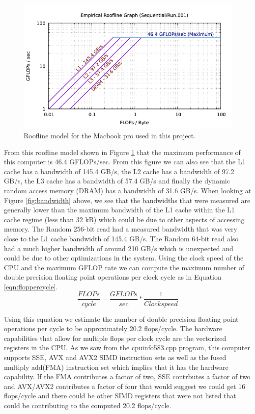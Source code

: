 \documentclass{article}
\begin{document}
\begin{figure}[H]
	\centering
	\label{fig:roofline}
	\includegraphics[width=0.7 \textwidth]{./roofline.png}	
	\caption{Roofline model for the Macbook pro used in this project.}
\end{figure}

From this roofline model shown in Figure \ref{fig:roofline} that the maximum performance of this computer is 46.4 GFLOPs/sec. From this figure we can also see that the L1 cache has a bandwidth of 145.4 GB/s, the L2 cache has a bandwidth of 97.2 GB/s, the L3 cache has a bandwidth of 57.4 GB/s and finally the dynamic random access memory (DRAM) has a bandwidth of 31.6 GB/s. When looking at Figure \ref{fig:bandwidth} above, we see that the bandwidths that were measured are generally lower than the maximum bandwidth of the L1 cache within the L1 cache regime (less than 32 kB) which could be due to other aspects of accessing memory. The Random 256-bit read had a measured bandwidth that was very close to the L1 cache bandwidth of 145.4 GB/s. The Random 64-bit read also had a much higher bandwidth of around 210 GB/s which is unexpected and could be due to other optimizations in the system. Using the clock speed of the CPU and the maximum GFLOP rate we can compute the maximum number of double precision floating point operations per clock cycle as in Equation \ref{eqn:floppercycle}. 
\begin{equation}
	\label{eqn:floppercycle}
	\frac{FLOPs}{cycle} = \frac{GFLOPs}{sec} * \frac{1}{Clock speed}
\end{equation}

Using this equation we estimate the number of double precision floating point operations per cycle to be approximately 20.2 flops/cycle. The hardware capabilities that allow for multiple flops per clock cycle are the vectorized registers in the CPU. As we saw from the cpuinfo583.cpp program, this computer supports SSE, AVX and AVX2 SIMD instruction sets as well as the fused multiply add(FMA) instruction set which implies that it has the hardware capability. If the FMA contributes a factor of two, SSE contrbutes a factor of two and AVX/AVX2 contributes a factor of four that would suggest we could get 16 flops/cycle and there could be other SIMD registers that were not listed that could be contributing to the computed 20.2 flops/cycle. 
\end{document}
